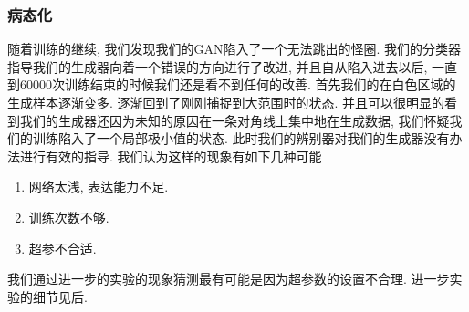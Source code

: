 \documentclass[lang=cn,11pt]{elegantpaper}
\begin{document}

\subsubsection{病态化}

随着训练的继续, 我们发现我们的GAN陷入了一个无法跳出的怪圈. 我们的分类器指导我们的生成器向着一个错误的方向进行了改进, 并且自从陷入进去以后, 一直到60000次训练结束的时候我们还是看不到任何的改善. 首先我们的在白色区域的生成样本逐渐变多. 逐渐回到了刚刚捕捉到大范围时的状态. 并且可以很明显的看到我们的生成器还因为未知的原因在一条对角线上集中地在生成数据, 我们怀疑我们的训练陷入了一个局部极小值的状态. 此时我们的辨别器对我们的生成器没有办法进行有效的指导. 我们认为这样的现象有如下几种可能

\begin{enumerate}
	\item 网络太浅, 表达能力不足.
	\item 训练次数不够.
	\item 超参不合适.
\end{enumerate}

我们通过进一步的实验的现象猜测最有可能是因为超参数的设置不合理. 进一步实验的细节见后.
\end{document}
